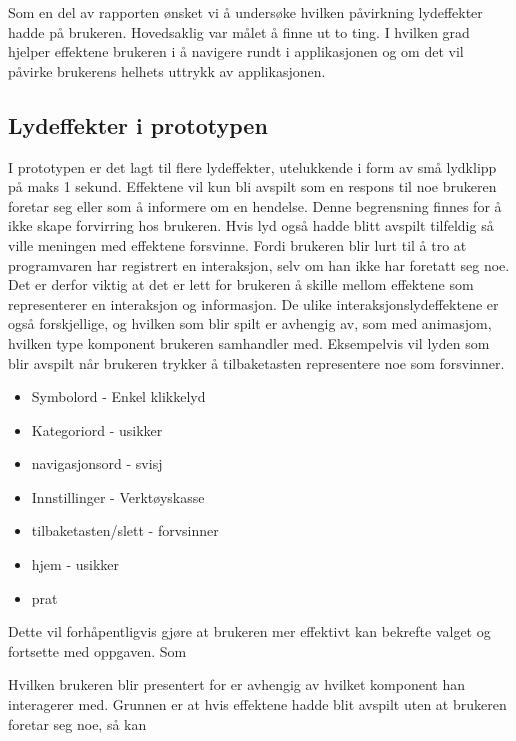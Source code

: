 Som en del av rapporten ønsket vi å undersøke hvilken påvirkning lydeffekter hadde på brukeren. Hovedsaklig var målet å finne ut to ting. I hvilken grad hjelper effektene brukeren i å navigere rundt i applikasjonen og om det vil påvirke brukerens helhets uttrykk av applikasjonen. 

\subsection{Lydeffekter i prototypen}

I prototypen er det lagt til flere lydeffekter, utelukkende i form av små lydklipp på maks 1 sekund. Effektene vil kun bli avspilt som en respons til noe brukeren foretar seg eller som å informere om en hendelse. Denne begrensning finnes for å ikke skape forvirring hos brukeren. Hvis lyd også hadde blitt avspilt tilfeldig så ville meningen med effektene forsvinne. Fordi brukeren blir lurt til å tro at programvaren har registrert en interaksjon, selv om han ikke har foretatt seg noe. Det er derfor viktig at det er lett for brukeren å skille mellom effektene som representerer en interaksjon og informasjon. De ulike interaksjonslydeffektene er også forskjellige, og hvilken som blir spilt er avhengig av,  som med animasjom,  hvilken type komponent brukeren samhandler med. Eksempelvis vil lyden som blir avspilt når brukeren trykker å tilbaketasten representere noe som forsvinner. 


\begin{itemize}
\item Symbolord - Enkel klikkelyd
\item Kategoriord - usikker
\item navigasjonsord - svisj
\item Innstillinger - Verktøyskasse
\item tilbaketasten/slett - forvsinner
\item hjem - usikker
\item prat
\end{itemize}








Dette vil forhåpentligvis gjøre at brukeren mer effektivt kan bekrefte valget og fortsette med oppgaven. Som 




Hvilken brukeren blir presentert for er avhengig av hvilket komponent han interagerer med.  Grunnen er at hvis effektene hadde blit avspilt uten at brukeren foretar seg noe, så kan


